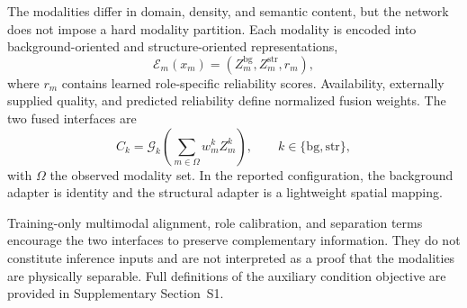 \documentclass[remotesensing,article,submit,pdftex,moreauthors]{Definitions/mdpi}
\begin{document}
The modalities differ in domain, density, and semantic content, but the network does not impose a hard modality partition. Each modality is encoded into background-oriented and structure-oriented representations,
\begin{equation}
\mathcal E_m(x_m)=\left(Z_m^{\mathrm{bg}},Z_m^{\mathrm{str}},r_m\right),
\end{equation}
where $r_m$ contains learned role-specific reliability scores. Availability, externally supplied quality, and predicted reliability define normalized fusion weights. The two fused interfaces are
\begin{equation}
C_k=\mathcal G_k\left(\sum_{m\in\Omega} w_m^k Z_m^k\right),
\qquad k\in\{\mathrm{bg},\mathrm{str}\},
\end{equation}
with $\Omega$ the observed modality set. In the reported configuration, the background adapter is identity and the structural adapter is a lightweight spatial mapping.

Training-only multimodal alignment, role calibration, and separation terms encourage the two interfaces to preserve complementary information. They do not constitute inference inputs and are not interpreted as a proof that the modalities are physically separable. Full definitions of the auxiliary condition objective are provided in Supplementary Section~S1.
\end{document}
